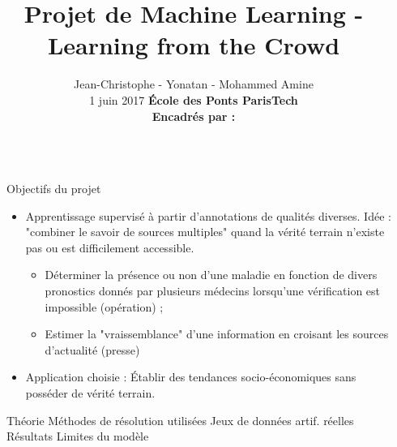 \documentclass[final]{beamer}
\title{Projet de Machine Learning - Learning from the Crowd} %
\author{\bsc{Corvisier} Jean-Christophe - \bsc{Deloro} Yonatan -  \bsc{Kheldouni} Mohammed Amine
\\\vspace{1cm} 1 juin 2017 \hspace{4cm} \textbf{École des Ponts ParisTech}
\\\vspace{1cm} \textbf{Encadr\'es par :} } %
\institute{\vspace{-2cm}}
\newlength{\sepwid}
\newlength{\onecolwid}
\begin{document}

\setlength{\belowcaptionskip}{2ex} %
\setlength\belowdisplayshortskip{2ex} %

\begin{frame}[t] %

\begin{columns}[t] %

\begin{column}{\sepwid}\end{column} %

\begin{column}{\onecolwid} %


\begin{alertblock}{Objectifs du projet}
\begin{itemize}
  \item Apprentissage supervisé à partir d'annotations de qualités diverses.
  Idée : "combiner le savoir de sources multiples" quand la vérité terrain n'existe pas ou est difficilement accessible.
  \begin{itemize}
      \item  Déterminer la présence ou non d'une maladie en fonction de divers pronostics donnés par plusieurs médecins lorsqu'une vérification est impossible (opération) ;
      \item  Estimer la "vraissemblance" d'une information en croisant les sources d'actualité (presse)
  \end{itemize}
  \item Application choisie : Établir des tendances socio-économiques sans posséder de vérité terrain.
\end{itemize}


Théorie
Méthodes de résolution utilisées
Jeux de données artif. réelles
Résultats
Limites du modèle


\end{alertblock}
\end{column}
\end{columns}
\end{frame}
\end{document}
